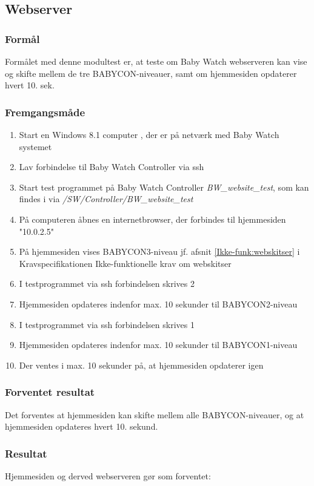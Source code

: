 \subsection*{Webserver}

\subsubsection*{Formål}
Formålet med denne modultest er, at teste om Baby Watch webserveren kan vise og skifte mellem de tre BABYCON-niveauer, samt om hjemmesiden opdaterer hvert 10. sek.

\subsubsection*{Fremgangsmåde}
\begin{enumerate}
\item Start en Windows 8.1 computer \citep{website:Windows_8_1}, der er på netværk med Baby Watch systemet
\item Lav forbindelse til Baby Watch Controller via ssh
\item Start test programmet på Baby Watch Controller \textit{BW\_website\_test}, som kan findes i \citep{cd} via \textit{/SW/Controller/BW\_website\_test}
\item På computeren åbnes en internetbrowser, der forbindes til hjemmesiden "10.0.2.5"
\item På hjemmesiden vises BABYCON3-niveau jf. afsnit \vref{Ikke-funk:webskitser} i Kravspecifikationen Ikke-funktionelle krav om webskitser
\item I testprogrammet via ssh forbindelsen skrives 2
\item Hjemmesiden opdateres indenfor max. 10 sekunder til BABYCON2-niveau
\item I testprogrammet via ssh forbindelsen skrives 1
\item Hjemmesiden opdateres indenfor max. 10 sekunder til BABYCON1-niveau
\item Der ventes i max. 10 sekunder på, at hjemmesiden opdaterer igen
\end{enumerate}

\subsubsection*{Forventet resultat} 
Det forventes at hjemmesiden kan skifte mellem alle BABYCON-niveauer, og at hjemmesiden opdateres hvert 10. sekund.

\subsubsection*{Resultat} 
Hjemmesiden og derved webserveren gør som forventet:


